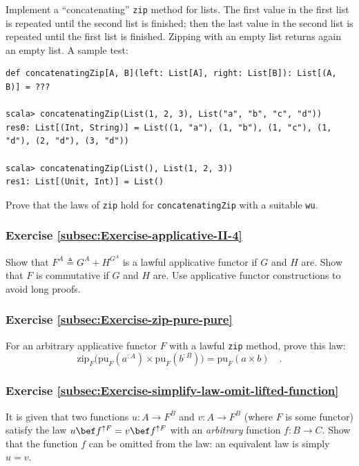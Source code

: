 Implement a \textsf{``}concatenating\textsf{''} \lstinline!zip! method
for lists. The first value in the first list is repeated until the
second list is finished; then the last value in the second list is
repeated until the first list is finished. Zipping with an empty list
returns again an empty list. A sample test:
\begin{lstlisting}
def concatenatingZip[A, B](left: List[A], right: List[B]): List[(A, B)] = ???

scala> concatenatingZip(List(1, 2, 3), List("a", "b", "c", "d"))
res0: List[(Int, String)] = List((1, "a"), (1, "b"), (1, "c"), (1, "d"), (2, "d"), (3, "d"))

scala> concatenatingZip(List(), List(1, 2, 3))
res1: List[(Unit, Int)] = List()
\end{lstlisting}
Prove that the laws of \lstinline!zip! hold for \lstinline!concatenatingZip!
with a suitable \lstinline!wu!.

\subsubsection{Exercise \label{subsec:Exercise-applicative-II-4}\ref{subsec:Exercise-applicative-II-4}}

Show that $F^{A}\triangleq G^{A}+H^{G^{A}}$ is a lawful applicative
functor if $G$ and $H$ are. Show that $F$ is commutative if $G$
and $H$ are. Use applicative functor constructions to avoid long
proofs.

\subsubsection{Exercise \label{subsec:Exercise-zip-pure-pure}\ref{subsec:Exercise-zip-pure-pure}}

For an arbitrary applicative functor $F$ with a lawful \lstinline!zip!
method, prove this law:
\[
\text{zip}_{F}\big(\text{pu}_{F}(a^{:A})\times\text{pu}_{F}(b^{:B})\big)=\text{pu}_{F}(a\times b)\quad.
\]


\subsubsection{Exercise \label{subsec:Exercise-simplify-law-omit-lifted-function}\ref{subsec:Exercise-simplify-law-omit-lifted-function}}

It is given that two functions $u:A\rightarrow F^{B}$ and $v:A\rightarrow F^{B}$
(where $F$ is some functor) satisfy the law $u\bef f^{\uparrow F}=v\bef f^{\uparrow F}$
with an \emph{arbitrary} function $f:B\rightarrow C$. Show that the
function $f$ can be omitted from the law: an equivalent law is simply
$u=v$.

